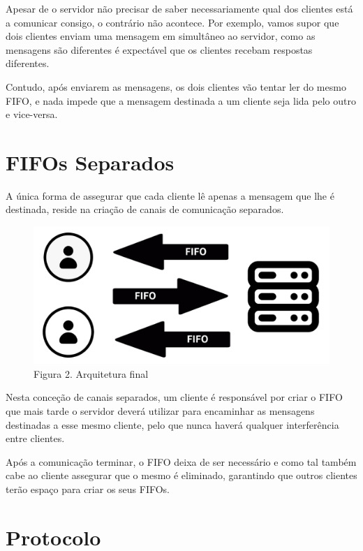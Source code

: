 \documentclass[12pt,a4paper]{report}
\begin{document}
        Apesar de o servidor não precisar de saber necessariamente qual dos clientes está a comunicar consigo, o contrário não acontece. Por exemplo, vamos supor que dois clientes enviam uma mensagem em simultâneo ao servidor, como as mensagens são diferentes é expectável que os clientes recebam respostas diferentes.

        Contudo, após enviarem as mensagens, os dois clientes vão tentar ler do mesmo FIFO, e nada impede que a mensagem destinada a um cliente seja lida pelo outro e vice-versa. 


    \section{FIFOs Separados}

        A única forma de assegurar que cada cliente lê apenas a mensagem que lhe é destinada, reside na criação de canais de comunicação separados.

        \newpage

        \begin{figure}[hb!]
            \centering
            \includegraphics{images/arq2.png}
            \caption*{Figura 2. Arquitetura final}
            \label{fig:Arq2}
        \end{figure}

        Nesta conceção de canais separados, um cliente é responsável por criar o FIFO que mais tarde o servidor deverá utilizar para encaminhar as mensagens destinadas a esse mesmo cliente, pelo que nunca haverá qualquer interferência entre clientes.

        Após a comunicação terminar, o FIFO deixa de ser necessário e como tal também cabe ao cliente assegurar que o mesmo é eliminado, garantindo que outros clientes terão espaço para criar os seus FIFOs.


    \section{Protocolo}
\end{document}
